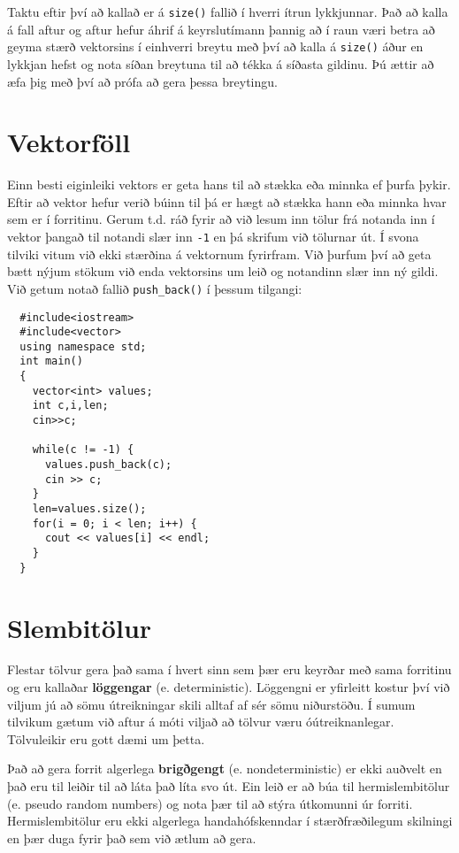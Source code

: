 Taktu eftir því að kallað er á {\tt size()} fallið í hverri ítrun lykkjunnar.
Það að kalla á fall aftur og aftur hefur áhrif á keyrslutímann þannig að í raun væri betra að geyma stærð vektorsins í einhverri breytu með því að kalla á 
{\tt size()} áður en lykkjan hefst og nota síðan breytuna til að tékka á síðasta gildinu.
Þú ættir að æfa þig með því að prófa að gera þessa breytingu.

\section{Vektorföll}

Einn besti eiginleiki vektors er geta hans til að stækka eða minnka ef þurfa þykir.
Eftir að vektor hefur verið búinn til þá er hægt að stækka hann eða minnka hvar sem er í forritinu.
Gerum t.d. ráð fyrir að við lesum inn tölur frá notanda inn í vektor þangað til notandi slær inn {\tt -1} en þá skrifum við tölurnar út.
Í svona tilviki vitum við ekki stærðina á vektornum fyrirfram.
Við þurfum því að geta bætt nýjum stökum við enda vektorsins um leið og notandinn slær inn ný gildi.
Við getum notað fallið {\tt push\_back()} í þessum tilgangi:

\begin{verbatim}
  #include<iostream>
  #include<vector>
  using namespace std;
  int main()
  {
    vector<int> values;
    int c,i,len;
    cin>>c;
    
    while(c != -1) {
      values.push_back(c);
      cin >> c;
    }
    len=values.size();
    for(i = 0; i < len; i++) {
      cout << values[i] << endl;
    }
  }

\end{verbatim}

\section{Slembitölur}
\label{random}
\label{pseudorandom}

Flestar tölvur gera það sama í hvert sinn sem þær eru keyrðar með sama forritinu og eru kallaðar {\bf löggengar} (e. deterministic). 
Löggengni er yfirleitt kostur því við viljum jú að sömu útreikningar skili alltaf af sér sömu niðurstöðu.
Í sumum tilvikum gætum við aftur á móti viljað að tölvur væru óútreiknanlegar.  Tölvuleikir eru gott dæmi um þetta.

Það að gera forrit algerlega {\bf brigðgengt} (e. nondeterministic) er ekki auðvelt en það eru til leiðir til að láta það líta svo út.
Ein leið er að búa til hermislembitölur (e. pseudo random numbers) og nota þær til að stýra útkomunni úr forriti.
Hermislembitölur eru ekki algerlega handahófskenndar í stærðfræðilegum skilningi en þær duga fyrir það sem við ætlum að gera.

